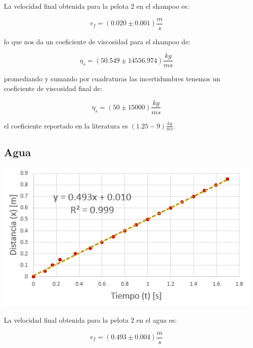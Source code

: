 \documentclass[DIV=calc, paper=a4, fontsize=11pt]{scrartcl}
\newenvironment{Figura}
  {\par\medskip\noindent\minipage{\linewidth}}
  {\endminipage\par\medskip}
\begin{document}
\begin{multicols}{2}
La velocidad final obtenida para la pelota 2 en el shampoo es:

\begin{equation*}
    v_f = (0.020 \pm 0.001) \frac{m}{s}
\end{equation*}

lo que nos da un coeficiente de viscosidad para el shampoo de:

\begin{equation*}
    \eta_{s} = (50.549 \pm 14556.974) \frac{kg}{ms}
\end{equation*}

promediando y sumando por cuadraturas las incertidumbres tenemos un coeficiente de viscosidad final de:

\begin{equation*}
    \eta_{s} = (50 \pm 15000) \frac{kg}{ms} 
\end{equation*}

el coeficiente reportado en la literatura es $(1.25 - 9)\frac{kg}{ms}$.

\subsection*{Agua}

\begin{Figura}
\centering
    \includegraphics[width=1\textwidth]{graficas/2 agua.PNG}
    \label{fig}
\end{Figura}

La velocidad final obtenida para la pelota 2 en el agua es:

\begin{equation*}
    v_f = (0.493 \pm 0.004) \frac{m}{s}
\end{equation*}


\end{multicols}
\end{document}
